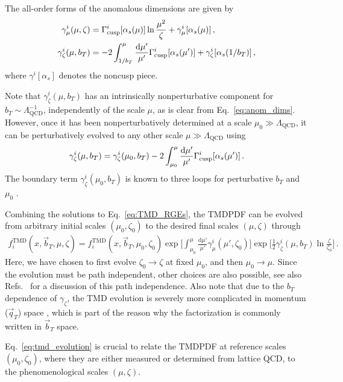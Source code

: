 \documentclass[11pt,a4paper]{article}
\DeclareRobustCommand{\eq}[1]{Eq.~\eqref{eq:#1}}
\DeclareRobustCommand{\mycites}[1]{Refs.~\cite{#1}}
\newcommand{\df}{\mathrm{d}}
\newcommand{\nn}{\nonumber}
\newcommand{\as}{\alpha_s}
\newcommand{\LQCD}{\Lambda_\mathrm{QCD}}
\newcommand\TMD{\mathrm{TMD}}
\newcommand{\bt}{\vec b_T}
\newcommand{\qt}{\vec q_T}
\newcommand{\GammaC}{\Gamma_{\rm cusp}}
\begin{document}
The all-order forms of the anomalous dimensions are given by
\begin{align} \label{eq:anom_dims}
 \gamma_\mu^i(\mu,\zeta) &= \GammaC^i[\as(\mu)] \ln\frac{\mu^2}{\zeta} + \gamma_\mu^i[\as(\mu)]
\,,\nn\\
 \gamma_\zeta^i(\mu,b_T) &= -2 \int_{1/b_T}^\mu \frac{\df\mu'}{\mu'} \GammaC^i[\as(\mu')] + \gamma_\zeta^i[\as(1/b_T)]
\,,\end{align}
where $\gamma^i[\as]$ denotes the noncusp piece.

Note that $\gamma_\zeta^i(\mu,b_T)$ has an intrinsically nonperturbative component for $b_T \sim \LQCD^{-1}$, independently of the scale $\mu$, as is clear from \eq{anom_dims}.
However, once it has been nonperturbatively determined at a scale $\mu_0 \gg \LQCD$, it can be perturbatively evolved to any other scale $\mu \gg \LQCD$ using
\begin{align}
 \gamma_\zeta^i(\mu,b_T) = \gamma_\zeta^i(\mu_0,b_T) - 2\int_{\mu_0}^\mu  \frac{\df\mu'}{\mu'} \GammaC^i[\as(\mu')]
\,.\end{align}
The boundary term $\gamma_\zeta^i(\mu_0,b_T)$ is known to three loops for perturbative $b_T$ and $\mu_0$ \cite{Li:2016axz,Li:2016ctv,Vladimirov:2016dll}.

Combining the solutions to \eq{TMD_RGEs}, the TMDPDF can be evolved from arbitrary initial scales $(\mu_0,\zeta_0)$ to the desired final scales $(\mu,\zeta)$ through
\begin{align} \label{eq:tmd_evolution}
 f_i^\TMD(x, \bt, \mu, \zeta) = f_i^\TMD(x, \bt, \mu_0, \zeta_0)
 \exp\biggl[ \int_{\mu_0}^\mu \frac{\df\mu'}{\mu'} \gamma_\mu^i(\mu',\zeta_0) \biggr]
 \exp\biggl[ \frac12 \gamma_\zeta^i(\mu,b_T) \ln\frac{\zeta}{\zeta_0} \biggr]
\,.\end{align}
Here, we have chosen to first evolve $\zeta_0 \to \zeta$ at fixed $\mu_0$, and then $\mu_0 \to \mu$.
Since the evolution must be path independent, other choices are also possible,
see also \mycites{Chiu:2012ir,Scimemi:2018xaf} for a discussion of this path independence.
Also note that due to the $b_T$ dependence of $\gamma_\zeta$, the TMD evolution is severely more complicated in momentum ($\qt$) space \cite{Ebert:2016gcn}, which is part of the reason why the factorization is commonly written in $\bt$ space.

\eq{tmd_evolution} is crucial to relate the TMDPDF at reference scales $(\mu_0,\zeta_0)$,
where they are either measured or determined from lattice QCD, to the phenomenological scales $(\mu,\zeta)$.
\end{document}
